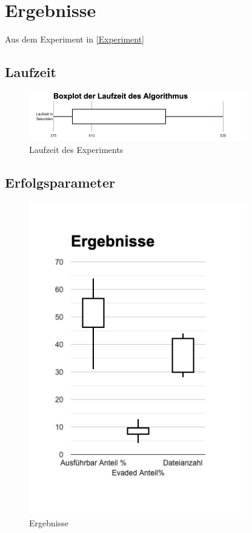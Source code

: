 \chapter{Ergebnisse}
Aus dem Experiment in \ref{Experiment}
\section{Laufzeit}
\begin{figure}[h]
    \centering
    \includegraphics[width=0.85\textwidth]{gfx/Abbildungen/Boxplot der Laufzeit des Algorithmus_CandlestickChart.png}
    \caption{Laufzeit des Experiments}
    \label{fig:result_runtime}
\end{figure}
\section{Erfolgsparameter}
\begin{figure}[h]
    \centering
    \includegraphics[width=0.85\textwidth]{gfx/Abbildungen/Ergebnisse_CandlestickChart.png}
    \caption{Ergebnisse}
    \label{fig:results}
\end{figure}


